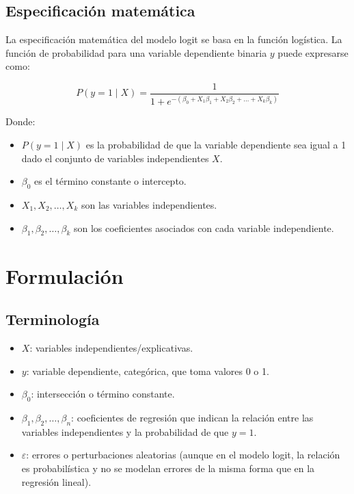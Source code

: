 \documentclass[
  letterpaper,
  DIV=11,
  numbers=noendperiod]{scrreprt}
\providecommand{\tightlist}{%
  \setlength{\itemsep}{0pt}\setlength{\parskip}{0pt}}\usepackage{longtable,booktabs,array}
\begin{document}
\subsection{Especificación
matemática}\label{especificaciuxf3n-matemuxe1tica-2}

La especificación matemática del modelo logit se basa en la función
logística. La función de probabilidad para una variable dependiente
binaria \(y\) puede expresarse como:

\[
P(y = 1 \mid X) = \frac{1}{1 + e^{-(\beta_0 +  X_1 \beta_1 + X_2 \beta_2 + \dots + X_k\beta_k)}}
\]

Donde:

\begin{itemize}
\tightlist
\item
  \(P(y = 1 \mid X)\) es la probabilidad de que la variable dependiente
  sea igual a 1 dado el conjunto de variables independientes \(X\).
\item
  \(\beta_0\) es el término constante o intercepto.
\item
  \(X_1, X_2, \dots, X_k\) son las variables independientes.
\item
  \(\beta_1, \beta_2, \dots, \beta_k\) son los coeficientes asociados
  con cada variable independiente.
\end{itemize}

\section{Formulación}\label{formulaciuxf3n-6}

\subsection{Terminología}\label{terminologuxeda-2}

\begin{itemize}
\tightlist
\item
  \textbf{\(X\)}: variables independientes/explicativas.
\item
  \textbf{\(y\)}: variable dependiente, categórica, que toma valores 0 o
  1.
\item
  \textbf{\(\beta_0\)}: intersección o término constante.
\item
  \textbf{\(\beta_1, \beta_2, \dots, \beta_n\)}: coeficientes de
  regresión que indican la relación entre las variables independientes y
  la probabilidad de que \(y = 1\).
\item
  \textbf{\(\varepsilon\)}: errores o perturbaciones aleatorias (aunque
  en el modelo logit, la relación es probabilística y no se modelan
  errores de la misma forma que en la regresión lineal).
\end{itemize}
\end{document}
